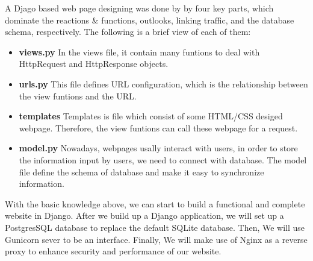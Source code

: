 A Djago based web page designing was done by by four key parts, which dominate the reactions
\& functions, outlooks, linking traffic, and the database schema, respectively.
The following is a brief view of each of them:
\begin{itemize}
	\item[] \textbf{views.py}
	In the views file, it contain many funtions to deal with HttpRequest and  HttpResponse objects.
	\item[] \textbf{urls.py}
	This file defines URL configuration, which is the relationship between the view funtions and the URL.
	\item[] \textbf{templates}
	Templates is file which consist of some HTML/CSS desiged webpage. Therefore, the view funtions can call these webpage for a request.
	\item[] \textbf{model.py}
	Nowadays, webpages usally interact with users, in order to store the information input by users, we need to connect with database.
	The model file define the schema of database and make it easy to synchronize information.\\
\end{itemize}
With the basic knowledge above, we can start to build a functional and complete website in Django.
After we build up a Django application, we will set up a PostgresSQL database to replace the default SQLite database.
Then, We will use Gunicorn sever to be an interface. Finally, We will make use of Nginx as a reverse proxy to enhance security and performance of our website.
